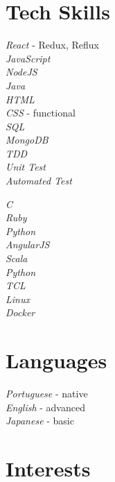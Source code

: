 \documentclass[10pt]{article} %
\begin{document}
\section{Tech Skills}

{
\textit{React} - Redux, Reflux\\
\textit{JavaScript}\\
\textit{NodeJS}\\
\textit{Java}\\
\textit{HTML}\\
\textit{CSS} - functional\\
\textit{SQL}\\
\textit{MongoDB}\\
\textit{TDD}\\
\textit{Unit Test}\\
\textit{Automated Test}\\
}


{
\textit{C}\\
\textit{Ruby}\\
\textit{Python}\\
\textit{AngularJS}\\
\textit{Scala}\\
\textit{Python}\\
\textit{TCL}\\
\textit{Linux}\\
\textit{Docker}\\
}



\section{Languages}
{
\textit{Portuguese} - native\\
\textit{English} - advanced\\
\textit{Japanese} - basic\\
}




\section{Interests}
\end{document}
